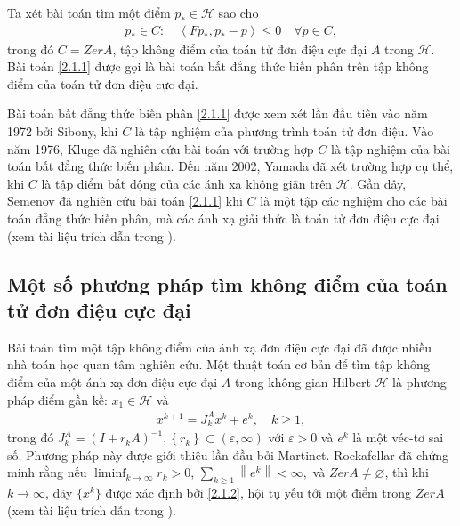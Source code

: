 \documentclass[14pt, oneside,A4paper]{book}
\theoremstyle{plain}
\begin{document}
Ta xét bài toán tìm một điểm $p_{*} \in \mathcal H$ sao cho
\begin{align} \label{2.1.1}
 p_{*} \in C: \quad \left \langle Fp_{*},p_{*}-p \right \rangle \leq 0 \quad \forall p \in C,
\end{align}
trong đó $C=ZerA$, tập không điểm của toán tử đơn điệu cực đại $A$ trong $\mathcal H$. Bài toán \eqref{2.1.1} được gọi là bài toán bất đẳng thức biến phân trên tập không điểm của toán tử đơn điệu cực đại.

Bài toán bất đẳng thức biến phân \eqref{2.1.1} được xem xét lần đầu tiên vào năm 1972 bởi Sibony, khi $C$ là tập nghiệm của phương trình toán tử đơn điệu. Vào năm 1976, Kluge đã nghiên cứu bài toán với trường hợp $C$ là tập nghiệm của bài toán bất đẳng thức biến phân. Đến năm 2002, Yamada đã xét trường hợp cụ thể, khi $C$ là tập điểm bất động của các ánh xạ không giãn trên $\mathcal H$. Gần đây, Semenov đã nghiên cứu bài toán \eqref{2.1.1} khi $C$ là một tập các nghiệm cho các bài toán đẳng thức biến phân, mà các ánh xạ giải thức là toán tử đơn điệu cực đại (xem tài liệu trích dẫn trong \cite{BHN}). 

\subsection{Một số phương pháp tìm không điểm của toán tử đơn điệu cực đại}

Bài toán tìm một tập không điểm của ánh xạ đơn điệu cực đại đã được nhiều nhà toán học quan tâm nghiên cứu. Một thuật toán cơ bản để tìm tập không điểm của một ánh xạ đơn điệu cực đại $A$ trong không gian Hilbert $\mathcal H$ là phương pháp điểm gần kề: $x_{1} \in \mathcal H$ và
\begin{align} \label{2.1.2}
 x^{k+1}=J^A_{k}x^{k}+e^{k},\quad k \geq 1, 
\end{align}
trong đó $J^A_{k}=(I+r_{k}A)^{-1},\left \{ r_{k} \right \}\subset (\varepsilon, \infty)$ với $\varepsilon >0$ và $e^{k}$ là một véc-tơ sai số. Phương pháp này được giới thiệu lần đầu bởi Martinet. Rockafellar đã chứng minh rằng nếu $\liminf_{k \rightarrow \infty}r_{k}>0$, $ \sum _{k\geq 1}\left \| e^{k} \right \| < \infty,$ và $ ZerA \neq \varnothing $, thì khi $k \rightarrow \infty$, dãy $\{x^{k}\}$ được xác định bởi \eqref{2.1.2}, hội tụ yếu tới một điểm trong $ZerA$ (xem tài liệu trích dẫn trong \cite{BHN}). 
	
\end{document}
